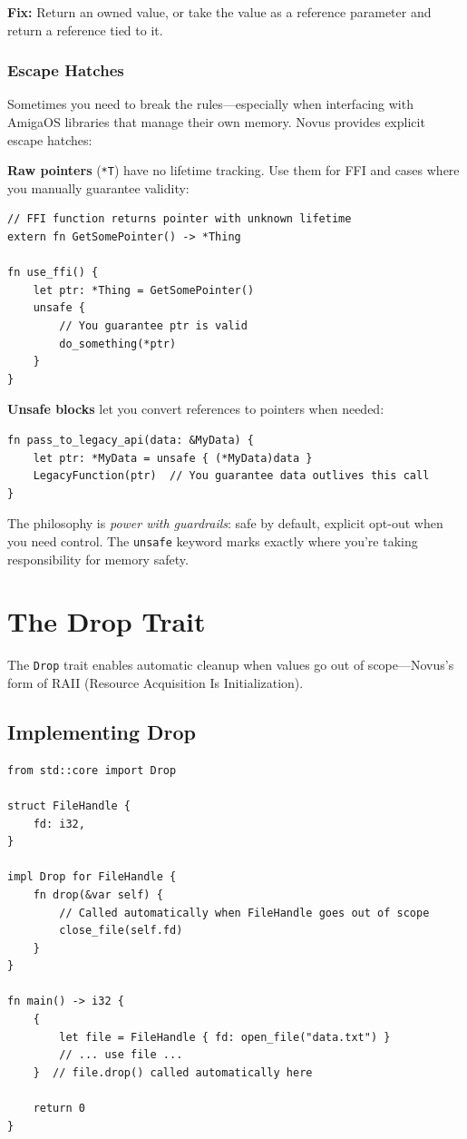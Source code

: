 \textbf{Fix:} Return an owned value, or take the value as a reference parameter and return a reference tied to it.

\subsubsection{Escape Hatches}

Sometimes you need to break the rules---especially when interfacing with AmigaOS libraries that manage their own memory. Novus provides explicit escape hatches:

\textbf{Raw pointers} (\texttt{*T}) have no lifetime tracking. Use them for FFI and cases where you manually guarantee validity:

\begin{lstlisting}
// FFI function returns pointer with unknown lifetime
extern fn GetSomePointer() -> *Thing

fn use_ffi() {
    let ptr: *Thing = GetSomePointer()
    unsafe {
        // You guarantee ptr is valid
        do_something(*ptr)
    }
}
\end{lstlisting}

\textbf{Unsafe blocks} let you convert references to pointers when needed:

\begin{lstlisting}
fn pass_to_legacy_api(data: &MyData) {
    let ptr: *MyData = unsafe { (*MyData)data }
    LegacyFunction(ptr)  // You guarantee data outlives this call
}
\end{lstlisting}

The philosophy is \textit{power with guardrails}: safe by default, explicit opt-out when you need control. The \texttt{unsafe} keyword marks exactly where you're taking responsibility for memory safety.

\section{The Drop Trait}

The \texttt{Drop} trait enables automatic cleanup when values go out of scope---Novus's form of RAII (Resource Acquisition Is Initialization).

\subsection{Implementing Drop}

\begin{lstlisting}
from std::core import Drop

struct FileHandle {
    fd: i32,
}

impl Drop for FileHandle {
    fn drop(&var self) {
        // Called automatically when FileHandle goes out of scope
        close_file(self.fd)
    }
}

fn main() -> i32 {
    {
        let file = FileHandle { fd: open_file("data.txt") }
        // ... use file ...
    }  // file.drop() called automatically here

    return 0
}
\end{lstlisting}

